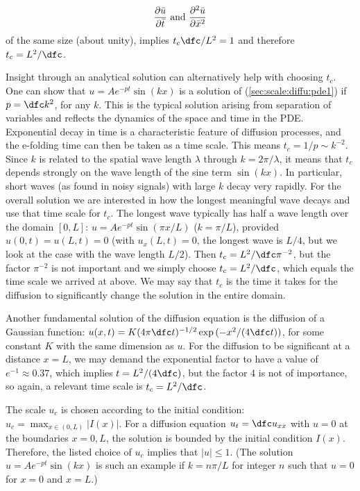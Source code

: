\documentclass[graybox,envcountchap,sectrefs,final]{svmonodo}
\begin{document}
\[ \frac{\partial \bar u}{\partial \bar t}\hbox{ and }
\frac{\partial^2 \bar u}{\partial \bar x^2}\]
of the same size (about unity),
implies $t_c\dfc/L^2=1$ and therefore $t_c = L^2/\dfc$.

Insight through an analytical solution can alternatively
help with choosing $t_c$.
One can show that $u=Ae^{-pt}\sin (kx)$ is a solution of
(\ref{sec:scale:diffu:pde1}) if $p=\dfc k^2$, for any $k$.
This is the typical solution arising from separation of variables
and reflects the dynamics of the space and time in the PDE.
Exponential decay in
time is a characteristic feature of diffusion processes, and
the e-folding time can then be taken as a time scale. This means
$t_c = 1/p \sim k^{-2}$. Since $k$ is related to the spatial
wave length $\lambda$
through $k=2\pi/\lambda$, it means that $t_c$ depends strongly on the wave
length of the sine term $\sin(kx)$.
In particular, short waves (as found in noisy signals) with
large $k$ decay very rapidly.
For the overall solution we are interested in how the longest meaningful
wave decays and use that time scale for $t_c$. The longest wave
typically has half a wave length over the domain $[0,L]$:
$u = Ae^{-pt}\sin(\pi x/L)$ ($k=\pi/L$), provided $u(0,t)=u(L,t)=0$
(with $u_x(L,t)=0$, the longest wave is $L/4$, but we look at the
case with the wave length $L/2$). Then $t_c=L^2/\dfc \pi^{-2}$,
but the factor $\pi^{-2}$ is not important and we simply choose
$t_c=L^2/\dfc$, which equals the time scale we arrived at above.
We may say that $t_c$ is the time it takes for the diffusion to
significantly change the solution in the entire domain.

Another fundamental solution of the diffusion equation is the
diffusion of a Gaussian function: $u(x,t)=K(4\pi\dfc
t)^{-1/2}\exp{(-x^2/(4\dfc t))}$, for some constant $K$ with
the same dimension as $u$. For the diffusion to be significant
at a distance $x=L$, we may demand the exponential factor to have a
value of $e^{-1}\approx 0.37$, which implies $t=L^2/(4\dfc)$, but the
factor 4 is not of importance, so again, a relevant time scale is
$t_c=L^2/\dfc$.

The scale $u_c$ is chosen according to the initial condition:
$u_c=\max_{x\in(0,L)}|I(x)|$. For a diffusion equation $u_t=\dfc u_{xx}$
with $u=0$ at the boundaries $x=0,L$, the solution is bounded by
the initial condition $I(x)$. Therefore, the listed choice of $u_c$
implies that
$|u|\leq 1$. (The solution $u=Ae^{-pt}\sin (kx)$ is such an example
if $k=n\pi/L$ for integer $n$ such that $u=0$ for $x=0$ and $x=L$.)
\end{document}
